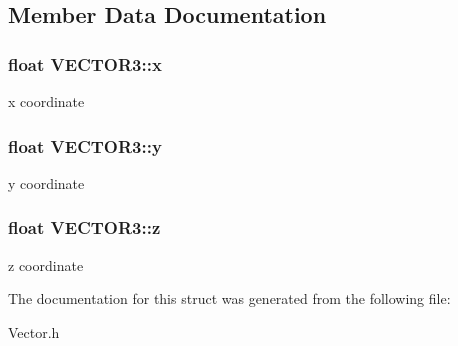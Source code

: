 \subsection{Member Data Documentation}
\hypertarget{struct_v_e_c_t_o_r3_a7bfb16208db9a4400c62edafb28811d8}{
\subsubsection[{x}]{\setlength{\rightskip}{0pt plus 5cm}float {\bf VECTOR3::x}}}
\label{struct_v_e_c_t_o_r3_a7bfb16208db9a4400c62edafb28811d8}
x coordinate \hypertarget{struct_v_e_c_t_o_r3_af7864f671d892d707a1ef6d9c04975bb}{
\subsubsection[{y}]{\setlength{\rightskip}{0pt plus 5cm}float {\bf VECTOR3::y}}}
\label{struct_v_e_c_t_o_r3_af7864f671d892d707a1ef6d9c04975bb}
y coordinate \hypertarget{struct_v_e_c_t_o_r3_a7cf8283bcb19b8ed92cd4c7e589e5ab3}{
\subsubsection[{z}]{\setlength{\rightskip}{0pt plus 5cm}float {\bf VECTOR3::z}}}
\label{struct_v_e_c_t_o_r3_a7cf8283bcb19b8ed92cd4c7e589e5ab3}
z coordinate 

The documentation for this struct was generated from the following file:\begin{DoxyCompactItemize}
\item 
Vector.h\end{DoxyCompactItemize}
